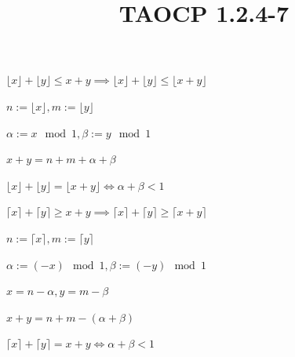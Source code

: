 \documentclass{article}
\title{TAOCP 1.2.4\mbox{-}7}
\begin{document}
\maketitle

\( \lfloor x \rfloor + \lfloor y \rfloor \leq x + y \implies \lfloor x \rfloor + \lfloor y \rfloor \leq \lfloor x + y \rfloor \)

\( n := \lfloor x \rfloor, m := \lfloor y \rfloor \)

\( \alpha := x \mod 1, \beta := y \mod 1 \)

\( x + y = n + m + \alpha + \beta \)

\( \lfloor x \rfloor + \lfloor y \rfloor = \lfloor x + y \rfloor \iff \alpha + \beta < 1 \)

\( \lceil x \rceil + \lceil y \rceil \geq x + y \implies \lceil x \rceil + \lceil y \rceil \geq \lceil x + y \rceil \)

\( n := \lceil x \rceil, m := \lceil y \rceil \)

\( \alpha := (-x) \mod 1, \beta := (-y) \mod 1 \)

\( x = n - \alpha, y = m - \beta \)

\( x + y = n + m - (\alpha + \beta) \)

\( \lceil x \rceil + \lceil y \rceil = x + y \iff \alpha + \beta < 1 \)
\end{document}
